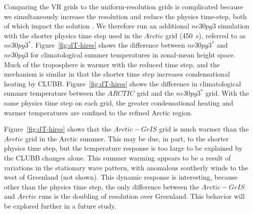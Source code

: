 \documentclass[draft]{agujournal2019}
\begin{document}
Comparing the VR grids to the uniform-resolution grids is complicated because we simultaneously increase the resolution and reduce the physics time-step, both of which impact the solution \cite{W2008TELLUS}. We therefore run an additional $ne30pg3$ simulation with the shorter physics time step used in the $Arctic$ grid (450~s), referred to as $ne30pg3^{*}$. Figure~\ref{fig:dT-hires} shows the difference between $ne30pg3^{*}$ and $ne30pg3$ for climatological summer temperatures in zonal-mean height space. Much of the troposphere is warmer with the reduced time step, and the mechanism is similar in that the shorter time step increases condensational heating by CLUBB. Figure~\ref{fig:dT-hires} shows the difference in climatological summer temperature between the $ARCTIC$ grid and the $ne30pg3^{*}$ grid.  With the same physics time step on each grid, the greater condensational heating and warmer temperatures are confined to the refined Arctic region.

Figure~\ref{fig:dT-hires} shows that the $Arctic-GrIS$ grid is much warmer than the $Arctic$ grid in the Arctic summer. This may be due, in part, to the shorter physics time step,
but the temperature response is too large to be explained by the CLUBB changes alone. This summer warming appears to be a result of variations in the stationary wave pattern, with anomalous southerly winds to the west of Greenland (not shown). This dynamic response is interesting, because other than the physics time step, the only difference between the $Arctic-GrIS$ and $Arctic$ runs is the doubling of resolution over Greenland. This behavior will be explored further in a future study.
\end{document}
